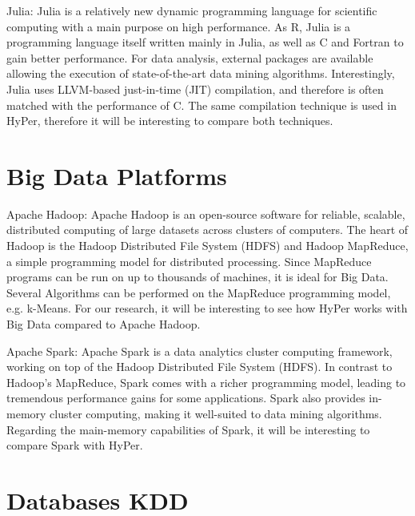 Julia: Julia is a relatively new dynamic programming language for scientific computing with a main purpose on high performance. As R, Julia is a programming language itself written mainly in Julia, as well as C and Fortran to gain better performance. For data analysis, external packages are available allowing the execution of state-of-the-art data mining algorithms. Interestingly, Julia uses LLVM-based just-in-time (JIT) compilation, and therefore is often matched with the performance of C. The same compilation technique is used in HyPer, therefore it will be interesting to compare both techniques.


\section{Big Data Platforms}

Apache Hadoop: Apache Hadoop is an open-source software for reliable, scalable, distributed computing of large datasets across clusters of computers. The heart of Hadoop is the Hadoop Distributed File System (HDFS) and Hadoop MapReduce, a simple programming model for distributed processing. Since MapReduce programs can be run on up to thousands of machines, it is ideal for Big Data. Several Algorithms can be performed on the MapReduce programming model, e.g. k-Means. For our research, it will be interesting to see how HyPer works with Big Data compared to Apache Hadoop.

Apache Spark: Apache Spark is a data analytics cluster computing framework, working on top of the Hadoop Distributed File System (HDFS). In contrast to Hadoop’s MapReduce, Spark comes with a richer programming model, leading to tremendous performance gains for some applications. Spark also provides in-memory cluster computing, making it well-suited to data mining algorithms. Regarding the main-memory capabilities of Spark, it will be interesting to compare Spark with HyPer.

\section{Databases KDD}
